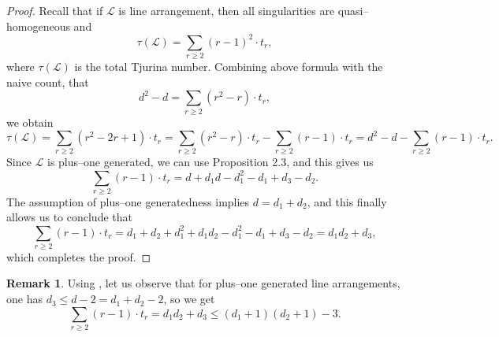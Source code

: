 \documentclass[12pt]{article}
\theoremstyle{plain}
\theoremstyle{definition}
\newtheorem{remark}[thm]{Remark}
\begin{document}
\begin{proof}
    Recall that if $\mathcal{L}$ is line arrangement, then all singularities are quasi--homogeneous and $$\tau(\mathcal{L})=\sum_{r\geq 2}{(r-1)^2\cdot t_r},$$
    where $\tau(\mathcal{L})$ is the total Tjurina number.
    Combining above formula with the naive count, that 
    $$d^2-d=\sum_{r\geq 2}{(r^2-r)\cdot t_r},$$
    we obtain
    $$\tau(\mathcal{L})=\sum_{r\geq 2}(r^2-2r+1)\cdot t_r=\sum_{r\geq 2}(r^2-r)\cdot t_r-\sum_{r\geq 2}(r-1)\cdot t_r=d^2-d-\sum_{r\geq 2}(r-1)\cdot t_r.$$
    Since $\mathcal{L}$ is plus--one generated, we can use Proposition 2.3, and this gives us
    $$\sum_{r\geq 2}(r-1)\cdot t_r=d+d_1d-d_1^2-d_1+d_3-d_2.$$
    The assumption of plus--one generatedness implies $d=d_1+d_2$, and this finally allows us to conclude that 
    $$\sum_{r\geq 2}(r-1)\cdot t_r=d_1+d_2+d_1^2+d_1d_2-d_1^2-d_1+d_3-d_2=d_1d_2+d_3,$$
    which completes the proof.
    

\end{proof}
\begin{remark}
Using \cite[Corollary 3.5]{Sch}, let us observe that for plus--one generated line arrangements, one has $d_{3}\leq d-2 = d_{1}+d_{2}-2$, so we get
$$\sum_{r\geq 2}(r-1)\cdot t_r=d_1d_2+d_3 \leq (d_{1}+1)(d_{2}+1)-3.$$
\end{remark}
\end{document}
